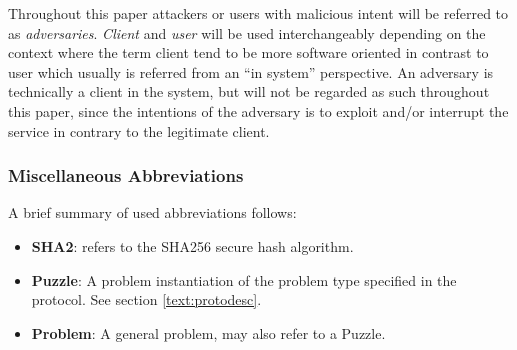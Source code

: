 Throughout this paper attackers or users with malicious intent will be referred to as \emph{adversaries}.
\emph{Client} and \emph{user} will be used interchangeably depending on the context where the term client tend to be more software oriented in contrast to user which usually is referred from an ``in system'' perspective.
An adversary is technically a client in the system, but will not be regarded as such throughout this paper, since the intentions of the adversary is to exploit and/or interrupt the service in contrary to the legitimate client. 

\subsubsection*{Miscellaneous Abbreviations}
A brief summary of used abbreviations follows:
\begin{itemize}
\item {\textbf{ SHA2}}: refers to the SHA256 secure hash algorithm\cite{sha2}.
\item \textbf{ Puzzle}: A problem instantiation of the problem type specified in the protocol. See section \ref{text:protodesc}.
\item \textbf{ Problem}: A general problem, may also refer to a Puzzle.
\end{itemize}